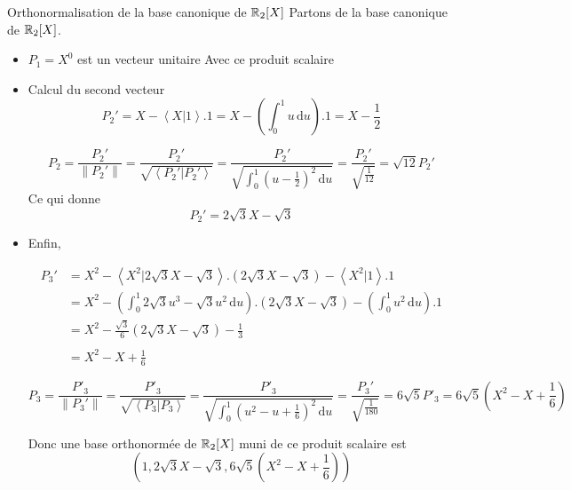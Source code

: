 \documentclass{article}
\renewenvironment{question_kholle}[2][ ]
{
	\subsection{\texorpdfstring{#2}{}}
	\notblank{#1}
	{
		\noindent #1
		\bigbreak
	}
	{}
	\begin{proof}
}
{
	\end{proof}
}
\begin{document}
\begin{question_kholle}[{On utilisera le produit scalaire $$
	\left\langle P | Q \right\rangle  = \int_{0}^{1} P(u)Q(u) \, \mathrm du
$$ }]{Orthonormalisation de la base canonique de $\mathbb R_2[X]$}
	Partons de la base canonique de $\mathbb R_{2}[X]$.
	\begin{itemize}[label=$\star$]
		\item $P_{1} =X^{0}$ est un vecteur unitaire Avec ce produit scalaire
		
		\item Calcul du second vecteur
$$
		P_{2}' = X - \left\langle X | 1 \right\rangle.1 = X - \left( \int_{0}^{1} u \, \mathrm du \right) .1 = X-\frac{1}{2}
$$
		
$$
		P_{2} = \frac{P_{2}'}{\|P_{2}'\|} = \frac{P_{2}'}{\sqrt{ \left\langle P_{2}' | P_{2}' \right\rangle  }}= \frac{P_{2}'}{\sqrt{ \int_{0}^{1} \left( u-\frac{1}{2} \right)^{2} \, \mathrm du }}
		= \frac{P_{2}'}{\sqrt{ \frac{1}{12} }}= \sqrt{ 12 }P_{2}'
$$
		Ce qui donne
$$
		P_{2}' = 2\sqrt{ 3 }X - \sqrt{ 3 }
$$
		
		\item Enfin, 
		
		\begin{align*}
			P_{3}' &= X^{2} - \left\langle X^{2} | 2\sqrt{ 3 }X-\sqrt{ 3 } \right\rangle.(2\sqrt{ 3 }X-\sqrt{ 3 })  - \left\langle X^{2} | 1 \right\rangle .1 \\
			&= X^{2} - \left( \int_{0}^{1} 2\sqrt{ 3 }u^{3} - \sqrt{ 3 }u^{2} \, \mathrm du  \right).(2\sqrt{ 3 }X-\sqrt{ 3 })-\left( \int_{0}^{1} u^{2} \, \mathrm du  \right).1 \\
			&= X^{2} - \frac{\sqrt{ 3 }}{6}(2\sqrt{ 3 }X - \sqrt{ 3 }) - \frac{1}{3} \\ \\
			&=X^{2} -X + \frac{1}{6}
		\end{align*}
		
		
$$
		P_{3} = \frac{P'_{3}}{\|P_{3}'\|}= \frac{P'_{3}}{\sqrt{ \left\langle P_{3} | P_{3} \right\rangle  }}= \frac{P'_{3}}{\sqrt{ \int_{0}^{1} \left( u^{2}-u +\frac{1}{6} \right)^{2} \, \mathrm du }}
		= \frac{P_{3}'}{\sqrt{ \frac{1}{180} }} =6\sqrt{ 5 }P'_{3} = 6\sqrt{ 5 }\left( X^{2}-X + \frac{1}{6} \right)
$$
		
		Donc une base orthonormée de $\mathbb R_{2}[X]$ muni de ce produit scalaire est
$$
		\left( 1, 2\sqrt{ 3 }X-\sqrt{ 3 }, 6\sqrt{ 5 }\left( X^{2}-X+\frac{1}{6} \right) \right)
$$
	\end{itemize}
\end{question_kholle}
\end{document}
